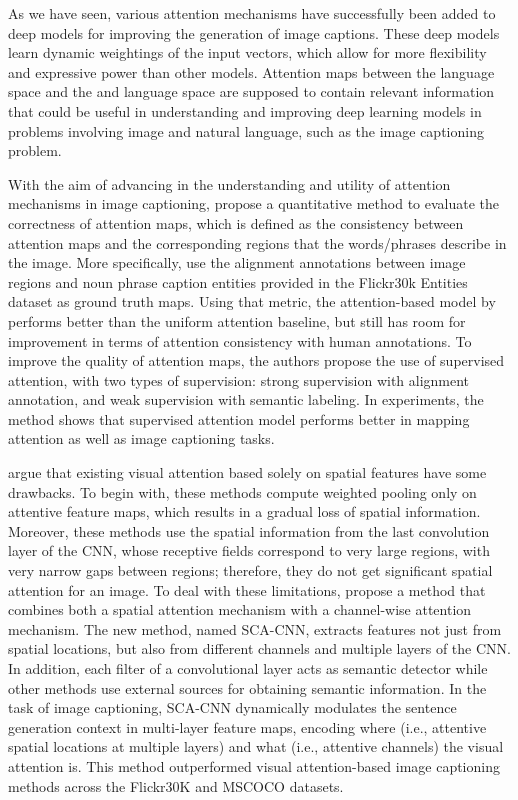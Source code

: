 As we have seen, various attention mechanisms have successfully been added to deep models for improving the generation of image captions. These deep models learn dynamic weightings of the input vectors, which allow for more flexibility and expressive power than other models. Attention maps between the language space and the and language space are supposed to contain relevant information that could be useful in understanding and improving deep learning models in problems involving image and natural language, such as the image captioning problem. 

With the aim of advancing in the understanding and utility of attention mechanisms in image captioning, \citet{Liu2017_SAM} propose a quantitative method to evaluate the correctness of attention maps, which is defined as the consistency between attention maps and the corresponding regions that the words/phrases describe in the image. More specifically, \citeauthor{Liu2017_SAM} use the alignment annotations between image regions and noun phrase caption entities provided in the Flickr30k Entities dataset \citep{Plummer2015} as ground truth maps. Using that metric, the attention-based model by \citet{Xu2015} performs better than the uniform attention baseline, but still has room for improvement in terms of attention consistency with human annotations. To improve the quality of attention maps, the authors propose the use of supervised attention, with two types of supervision: strong supervision with alignment annotation, and weak supervision with semantic labeling. In experiments, the method shows that supervised attention model performs better in mapping attention as well as image captioning tasks.

\citet{Chen2017_SCA} argue that existing visual attention based solely on spatial features have some drawbacks. To begin with, these methods compute weighted pooling only on attentive feature maps, which results in a gradual loss of spatial information. Moreover, these methods use the spatial information from the last convolution layer of the CNN, whose receptive fields correspond to very large regions, with very narrow gaps between regions; therefore, they do not get significant spatial attention for an image. To deal with these limitations, \citeauthor{Chen2017_SCA} propose a method that combines both a spatial attention mechanism with a channel-wise attention mechanism. The new method, named SCA-CNN, extracts features not just from spatial locations, but also from different channels and multiple layers of the CNN. In addition, each filter of a convolutional layer acts as semantic detector \citep{Zeiler2014} while other methods use external sources for obtaining semantic information. In the task of image captioning, SCA-CNN dynamically modulates the sentence generation context in multi-layer feature maps, encoding where (i.e., attentive spatial locations at multiple layers) and what (i.e., attentive channels) the visual attention is. This method outperformed visual attention-based image captioning methods across the Flickr30K and MSCOCO datasets.

